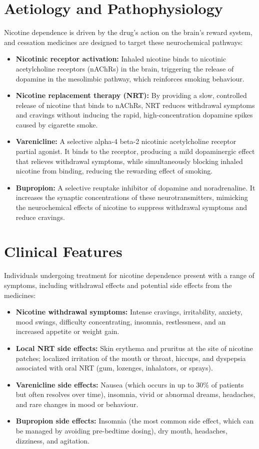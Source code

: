 \section*{Aetiology and Pathophysiology}
Nicotine dependence is driven by the drug's action on the brain's reward system, and cessation medicines are designed to target these neurochemical pathways:
\begin{itemize}
    \item \textbf{Nicotinic receptor activation:} Inhaled nicotine binds to nicotinic acetylcholine receptors (nAChRs) in the brain, triggering the release of dopamine in the mesolimbic pathway, which reinforces smoking behaviour.
    \item \textbf{Nicotine replacement therapy (NRT):} By providing a slow, controlled release of nicotine that binds to nAChRs, NRT reduces withdrawal symptoms and cravings without inducing the rapid, high-concentration dopamine spikes caused by cigarette smoke.
    \item \textbf{Varenicline:} A selective alpha-4 beta-2 nicotinic acetylcholine receptor partial agonist. It binds to the receptor, producing a mild dopaminergic effect that relieves withdrawal symptoms, while simultaneously blocking inhaled nicotine from binding, reducing the rewarding effect of smoking.
    \item \textbf{Bupropion:} A selective reuptake inhibitor of dopamine and noradrenaline. It increases the synaptic concentrations of these neurotransmitters, mimicking the neurochemical effects of nicotine to suppress withdrawal symptoms and reduce cravings.
\end{itemize}

\section*{Clinical Features}
Individuals undergoing treatment for nicotine dependence present with a range of symptoms, including withdrawal effects and potential side effects from the medicines:
\begin{itemize}
    \item \textbf{Nicotine withdrawal symptoms:} Intense cravings, irritability, anxiety, mood swings, difficulty concentrating, insomnia, restlessness, and an increased appetite or weight gain.
    \item \textbf{Local NRT side effects:} Skin erythema and pruritus at the site of nicotine patches; localized irritation of the mouth or throat, hiccups, and dyspepsia associated with oral NRT (gum, lozenges, inhalators, or sprays).
    \item \textbf{Varenicline side effects:} Nausea (which occurs in up to 30\% of patients but often resolves over time), insomnia, vivid or abnormal dreams, headaches, and rare changes in mood or behaviour.
    \item \textbf{Bupropion side effects:} Insomnia (the most common side effect, which can be managed by avoiding pre-bedtime dosing), dry mouth, headaches, dizziness, and agitation.
\end{itemize}

